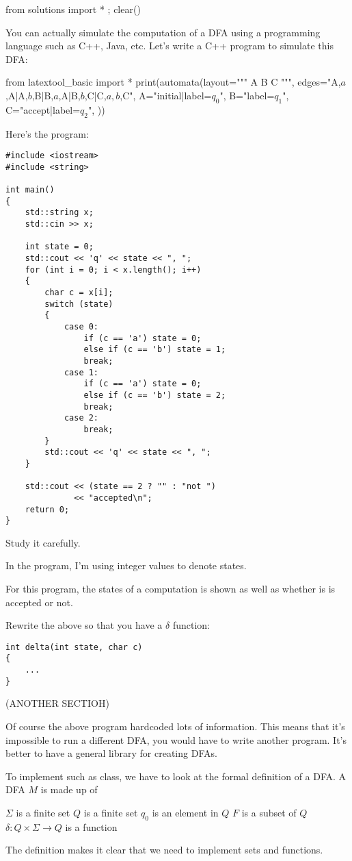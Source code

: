 \begin{python0}
  from solutions import * ; clear()
\end{python0}

You can actually simulate the computation
of a DFA using a programming language such as C++, Java, etc.
Let's write a C++ program to simulate this DFA:

\begin{python}
from latextool_basic import *
print(automata(layout="""
A  B  C
""",
edges="A,$a$,A|A,$b$,B|B,$a$,A|B,$b$,C|C,$a,b$,C",
A="initial|label=$q_0$",
B="label=$q_1$",
C="accept|label=$q_2$",
))
\end{python}

Here's the program:
\begin{Verbatim}[frame=single, fontsize=\small]
#include <iostream>
#include <string>

int main()
{
    std::string x;
    std::cin >> x;

    int state = 0;
    std::cout << 'q' << state << ", ";
    for (int i = 0; i < x.length(); i++)
    {
        char c = x[i];
        switch (state)
        {
            case 0:
                if (c == 'a') state = 0;
                else if (c == 'b') state = 1;
                break;
            case 1:
                if (c == 'a') state = 0;
                else if (c == 'b') state = 2;
                break;
            case 2:
                break;
        } 
        std::cout << 'q' << state << ", ";
    }
   
    std::cout << (state == 2 ? "" : "not ")
              << "accepted\n";
    return 0;
}
\end{Verbatim}
Study it carefully.

In the program, I'm using integer values to denote states.

For this program, the states of a computation is shown as well as whether is
is accepted or not.

\begin{ex}
Rewrite the above so that you have a $\delta$ function:
\begin{Verbatim}[frame=single, fontsize=\small]
int delta(int state, char c)
{
    ...
}
\end{Verbatim}
\end{ex}

(ANOTHER SECTIOH)

Of course the above program hardcoded lots of information.
This means that it's impossible to run a different DFA, you would have to
write another program.
It's better to have a general library for creating DFAs.

To implement such as class, we have to look at the
formal definition of a DFA.
A DFA $M$ is made up of
\begin{enumerate}[label=\textnormal{(\alph*)},itemsep=0pt,nosep,noitemsep,partopsep=0pt,topsep=0pt,parsep=0pt]
  \li $\Sigma$ is a finite set
  \li $Q$ is a finite set
  \li $q_0$ is an element in $Q$
  \li $F$ is a subset of $Q$
  \li $\delta: Q \times \Sigma \rightarrow Q$ is a function 
\end{enumerate}
The definition makes it clear that we need to implement
sets and functions.

